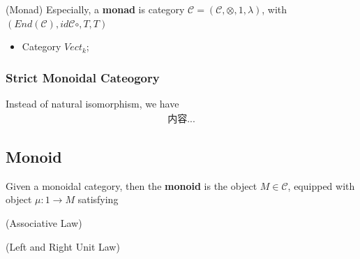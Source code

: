 \documentclass[Total.tex]{subfiles}
\begin{document}
				\begin{example}
					(Monad) Especially, a \textbf{monad} is category $\mathcal{C}=(\mathcal{C},\otimes,1,\lambda)$, with $(End(\mathcal{C}),id\mathcal{C}\circ,T,T)$
				\end{example}
				
				\begin{example}
					\begin{itemize}
						\item Category $Vect_k$;
					\end{itemize}
				\end{example}
				
				\subsubsection{Strict Monoidal Cateogory}
				\begin{Def}
					Instead of natural isomorphism, we have
					\begin{gather*}
						内容...
					\end{gather*}
				\end{Def}
				\subsection{Monoid}
					\begin{Def}
						Given a monoidal category, then the \textbf{monoid} is the object $M\in \mathcal{C}$, equipped with object $\mu:1\rightarrow M$ satisfying
						\begin{center}
							(Associative Law)
						\end{center}
						\begin{center}
							(Left and Right Unit Law)
						\end{center}
					\end{Def}
\end{document}
